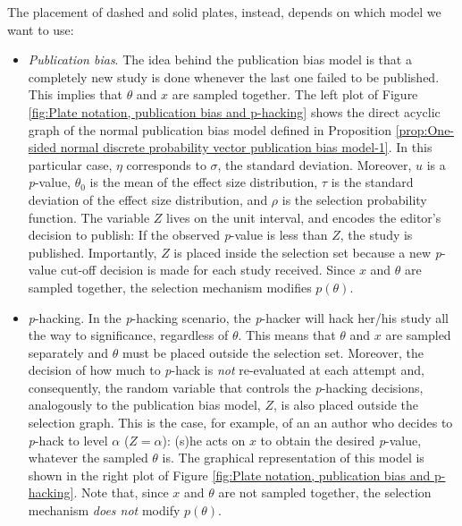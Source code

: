 \documentclass{article}
\theoremstyle{plain}
\theoremstyle{definition}
\begin{document}
The placement of dashed and solid plates, instead, depends on which model we want to use:
\begin{itemize}
\item \emph{Publication bias}. The idea behind the publication bias model is that a completely new study is done whenever the last one failed to be published. This implies that $\theta$ and $x$ are sampled together. The left plot of Figure \ref{fig:Plate notation, publication bias and p-hacking} shows the direct acyclic graph of the normal publication bias model defined in Proposition \ref{prop:One-sided normal discrete probability vector publication bias model-1}. In this particular case, $\eta$ corresponds to $\sigma$, the standard deviation. Moreover, $u$ is a \emph{p}-value, $\theta_{0}$ is the mean of the effect size distribution, $\tau$ is the standard deviation of the effect size distribution, and $\rho$ is the selection probability function. The variable $Z$ lives on the unit interval, and encodes the editor's decision to publish: If the observed \emph{p}-value is less than $Z$, the study is published. Importantly, $Z$ is placed inside the selection set because a new \emph{p}-value cut-off decision is made for each study received. Since $x$ and $\theta$ are sampled together, the selection mechanism modifies $p\left(\theta\right)$.%

\item \textit{p}-hacking. In the \textit{p}-hacking scenario, the \textit{p}-hacker will hack her/his study all the way to significance, regardless of $\theta$. This means that $\theta$ and $x$ are sampled separately and $\theta$ must be placed outside the selection set. Moreover, the decision of how much to \textit{p}-hack is \emph{not} re-evaluated at each attempt and, consequently, the random variable that controls the \textit{p}-hacking decisions, analogously to the publication bias model, $Z$, is also placed outside the selection graph. This is the case, for example, of an an author who decides to \textit{p}-hack to level $\alpha$ ($Z = \alpha$): (s)he acts on $x$ to obtain the desired \textit{p}-value, whatever the sampled $\theta$ is. The graphical representation of this model is shown in the right plot of Figure \ref{fig:Plate notation, publication bias and p-hacking}. Note that, since $x$ and $\theta$ are not sampled together, the selection mechanism \emph{does not} modify $p\left(\theta\right)$.
\end{itemize}
\end{document}
